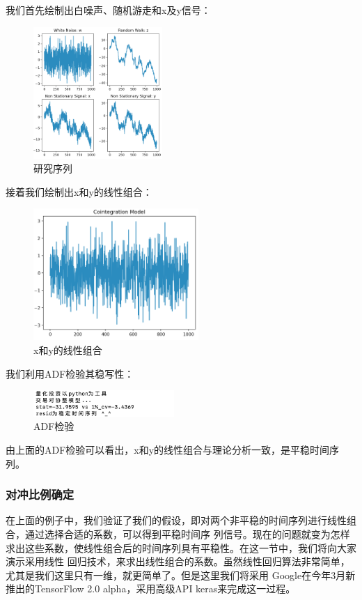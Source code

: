 \documentclass{article}
\begin{document}
我们首先绘制出白噪声、随机游走和x及y信号：
\begin{figure}[H]
	\caption{研究序列}
	\label{f000042}
	\centering
	\includegraphics[height=5cm]{images/f000042}
\end{figure}
接着我们绘制出x和y的线性组合：
\begin{figure}[H]
	\caption{x和y的线性组合}
	\label{f000043}
	\centering
	\includegraphics[height=5cm]{images/f000043}
\end{figure}
我们利用ADF检验其稳写性：
\begin{figure}[H]
	\caption{ADF检验}
	\label{f000044}
	\centering
	\includegraphics[height=1cm]{images/f000044}
\end{figure}
由上面的ADF检验可以看出，x和y的线性组合与理论分析一致，是平稳时间序列。
\subsubsection{对冲比例确定}
在上面的例子中，我们验证了我们的假设，即对两个非平稳的时间序列进行线性组合，通过选择合适的系数，可以得到平稳时间序
列信号。现在的问题就变为怎样求出这些系数，使线性组合后的时间序列具有平稳性。在这一节中，我们将向大家演示采用线性
回归技术，来求出线性组合的系数。虽然线性回归算法非常简单，尤其是我们这里只有一维，就更简单了。但是这里我们将采用
Google在今年3月新推出的TensorFlow 2.0 alpha，采用高级API keras来完成这一过程。\newline
\end{document}
